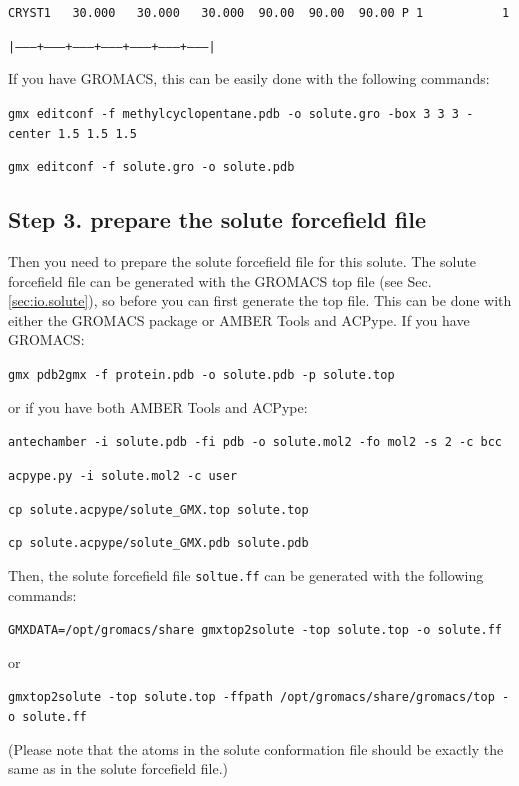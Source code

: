 \documentclass[aip,amsmath,amssymb,reprint,onecolumn]{revtex4-1}
\begin{document}
\texttt{\color{navyblue}\small CRYST1\ \ \ 30.000\ \ \ 30.000\ \ \ 30.000\ \ 90.00\ \ 90.00\ \ 90.00\ P\ 1\ \ \ \ \ \ \ \ \ \ \ 1}

\texttt{\color[rgb]{0.7,0.7,0.7}\small |--------+---------+---------+---------+---------+---------+---------|}

If you have GROMACS, this can be easily done with the following commands:

\texttt{\color{blue}\small gmx editconf -f methylcyclopentane.pdb -o solute.gro -box 3 3 3 -center 1.5 1.5 1.5}

\texttt{\color{blue}\small gmx editconf -f solute.gro -o solute.pdb}


\subsection*{Step 3. prepare the solute forcefield file}

Then you need to prepare the solute forcefield file for this solute. The solute forcefield file can be generated with the GROMACS top file (see Sec. \ref{sec:io.solute}), so before you can first generate the top file. This can be done with either the GROMACS package or AMBER Tools and ACPype. If you have GROMACS:

\texttt{\color{blue}\small gmx pdb2gmx -f protein.pdb -o solute.pdb -p solute.top}

or if you have both AMBER Tools and ACPype:

\texttt{\color{blue}\small antechamber -i solute.pdb -fi pdb -o solute.mol2 -fo mol2 -s 2 -c bcc}

\texttt{\color{blue}\small acpype.py -i solute.mol2 -c user}

\texttt{\color{blue}\small cp solute.acpype/solute\_GMX.top solute.top}

\texttt{\color{blue}\small cp solute.acpype/solute\_GMX.pdb solute.pdb}

Then, the solute forcefield file \texttt{soltue.ff} can be generated with the following commands:

\texttt{\color{blue}\small GMXDATA=/opt/gromacs/share gmxtop2solute -top solute.top -o solute.ff}

or

\texttt{\color{blue}\small gmxtop2solute -top solute.top -ffpath /opt/gromacs/share/gromacs/top -o solute.ff}

(Please note that the atoms in the solute conformation file should be exactly the same as in the solute forcefield file.)
\end{document}
